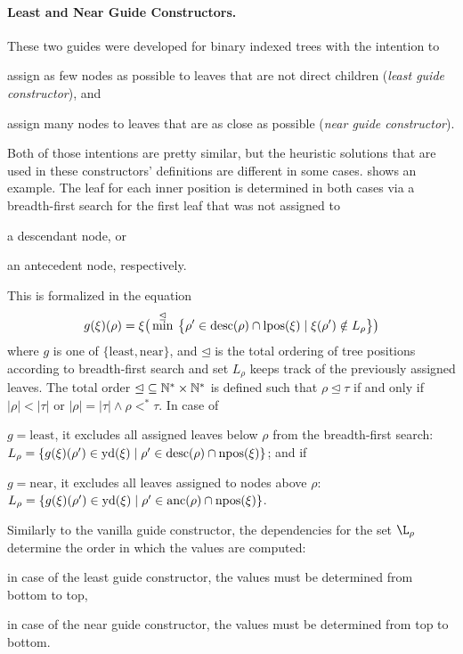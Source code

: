 \documentclass[../../document.tex]{subfiles}
\begin{document}
    \paragraph{Least and Near Guide Constructors.}
    These two guides were developed for binary indexed trees with the intention to
    \begin{inparaenum}
        \item assign as few nodes as possible to leaves that are not direct children (\emph{least guide constructor}), and
        \item assign many nodes to leaves that are as close as possible (\emph{near guide constructor}).
    \end{inparaenum}
    Both of those intentions are pretty similar, but the heuristic solutions that are used in these constructors' definitions are different in some cases.
     shows an example.
    The leaf for each inner position is determined in both cases via a breadth-first search for the first leaf that was not assigned to
    \begin{inparaenum}
        \item a descendant node, or
        \item an antecedent node, respectively.
    \end{inparaenum}
    This is formalized in the equation
    \[
    g(\xi)(\rho) = \xi\big( \min^{\unlhd} \: \big\{\rho' \in \operatorname{desc}(\rho) \cap \operatorname{lpos}(\xi) \mid \xi(\rho') \notin L_\rho \big\} \big)
    \]
    where \(g\) is one of \(\{\mathrm{least}, \mathrm{near}\}\), and \(\unlhd\) is the total ordering of tree positions according to breadth-first search and set \(L_\rho\) keeps track of the previously assigned leaves.
    The total order \(\unlhd \subseteq \mathbb{N}^* \times \mathbb{N}^*\) is defined such that \(\rho \unlhd \tau\) if and only if \(|\rho| < |\tau|\) or \(|\rho| = |\tau| \land \rho <^* \tau\).
    In case of
    \begin{inparaenum}
        \item \(g = \mathrm{least}\), it excludes all assigned leaves below \(\rho\) from the breadth-first search:
        \(L_\rho = \{ g(\xi)(\rho') \in \operatorname{yd}(\xi) \mid \rho' \in \operatorname{desc}(\rho) \cap \operatorname{npos}(\xi) \}\); and if
        \item \(g = \mathrm{near}\), it excludes all leaves assigned to nodes above \(\rho\):
        \(L_\rho = \{ g(\xi)(\rho') \in \operatorname{yd}(\xi) \mid \rho' \in \operatorname{anc}(\rho) \cap \operatorname{npos}(\xi) \}\).
    \end{inparaenum}
    Similarly to the vanilla guide constructor, the dependencies for the set \(\L_\rho\) determine the order in which the values are computed:
    \begin{inparaenum}
        \item in case of the least guide constructor, the values must be determined from bottom to top,
        \item in case of the near guide constructor, the values must be determined from top to bottom.
    \end{inparaenum}
\end{document}
